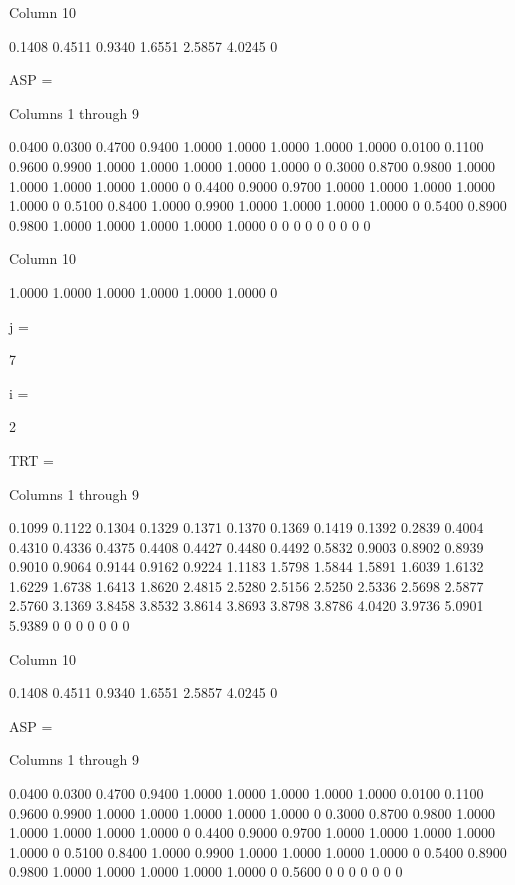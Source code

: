   Column 10

    0.1408
    0.4511
    0.9340
    1.6551
    2.5857
    4.0245
         0


ASP =

  Columns 1 through 9

    0.0400    0.0300    0.4700    0.9400    1.0000    1.0000    1.0000    1.0000    1.0000
    0.0100    0.1100    0.9600    0.9900    1.0000    1.0000    1.0000    1.0000    1.0000
         0    0.3000    0.8700    0.9800    1.0000    1.0000    1.0000    1.0000    1.0000
         0    0.4400    0.9000    0.9700    1.0000    1.0000    1.0000    1.0000    1.0000
         0    0.5100    0.8400    1.0000    0.9900    1.0000    1.0000    1.0000    1.0000
         0    0.5400    0.8900    0.9800    1.0000    1.0000    1.0000    1.0000    1.0000
         0         0         0         0         0         0         0         0         0

  Column 10

    1.0000
    1.0000
    1.0000
    1.0000
    1.0000
    1.0000
         0


j =

     7


i =

     2


TRT =

  Columns 1 through 9

    0.1099    0.1122    0.1304    0.1329    0.1371    0.1370    0.1369    0.1419    0.1392
    0.2839    0.4004    0.4310    0.4336    0.4375    0.4408    0.4427    0.4480    0.4492
    0.5832    0.9003    0.8902    0.8939    0.9010    0.9064    0.9144    0.9162    0.9224
    1.1183    1.5798    1.5844    1.5891    1.6039    1.6132    1.6229    1.6738    1.6413
    1.8620    2.4815    2.5280    2.5156    2.5250    2.5336    2.5698    2.5877    2.5760
    3.1369    3.8458    3.8532    3.8614    3.8693    3.8798    3.8786    4.0420    3.9736
    5.0901    5.9389         0         0         0         0         0         0         0

  Column 10

    0.1408
    0.4511
    0.9340
    1.6551
    2.5857
    4.0245
         0


ASP =

  Columns 1 through 9

    0.0400    0.0300    0.4700    0.9400    1.0000    1.0000    1.0000    1.0000    1.0000
    0.0100    0.1100    0.9600    0.9900    1.0000    1.0000    1.0000    1.0000    1.0000
         0    0.3000    0.8700    0.9800    1.0000    1.0000    1.0000    1.0000    1.0000
         0    0.4400    0.9000    0.9700    1.0000    1.0000    1.0000    1.0000    1.0000
         0    0.5100    0.8400    1.0000    0.9900    1.0000    1.0000    1.0000    1.0000
         0    0.5400    0.8900    0.9800    1.0000    1.0000    1.0000    1.0000    1.0000
         0    0.5600         0         0         0         0         0         0         0

